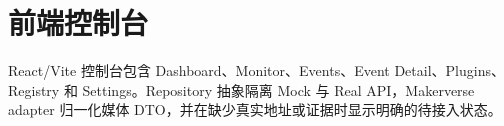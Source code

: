 \section{前端控制台}

React/Vite 控制台包含 Dashboard、Monitor、Events、Event Detail、Plugins、Registry 和 Settings。Repository 抽象隔离 Mock 与 Real API，Makerverse adapter 归一化媒体 DTO，并在缺少真实地址或证据时显示明确的待接入状态。
